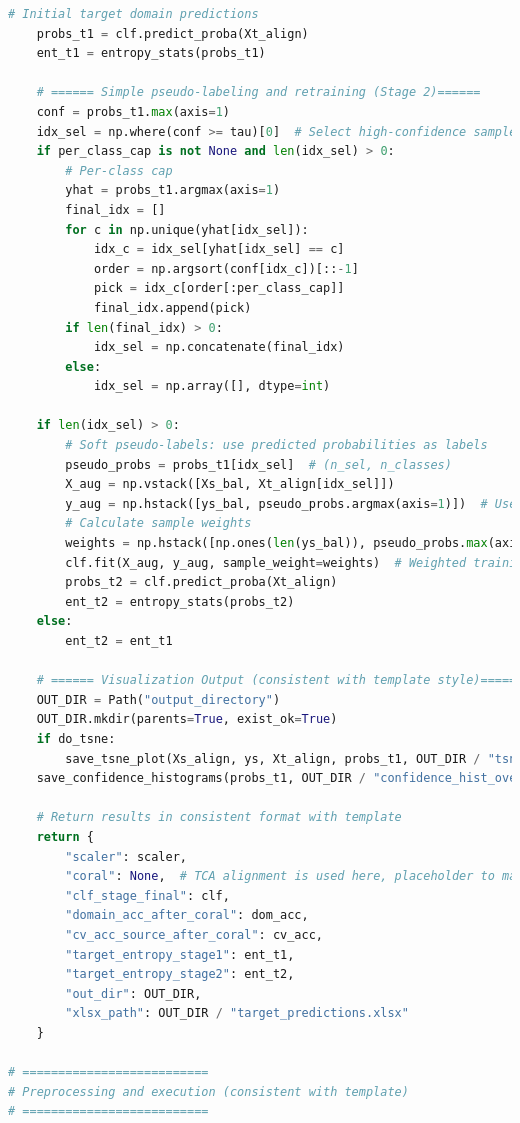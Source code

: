 \documentclass[a4paper]{CPIPC}
\numberwithin{equation}{section}
\begin{document}
\begin{lstlisting}[language=Python, caption=Random Forest Classifier]
    # Initial target domain predictions
    probs_t1 = clf.predict_proba(Xt_align)
    ent_t1 = entropy_stats(probs_t1)

    # ====== Simple pseudo-labeling and retraining (Stage 2)======
    conf = probs_t1.max(axis=1)
    idx_sel = np.where(conf >= tau)[0]  # Select high-confidence samples
    if per_class_cap is not None and len(idx_sel) > 0:
        # Per-class cap
        yhat = probs_t1.argmax(axis=1)
        final_idx = []
        for c in np.unique(yhat[idx_sel]):
            idx_c = idx_sel[yhat[idx_sel] == c]
            order = np.argsort(conf[idx_c])[::-1]
            pick = idx_c[order[:per_class_cap]]
            final_idx.append(pick)
        if len(final_idx) > 0:
            idx_sel = np.concatenate(final_idx)
        else:
            idx_sel = np.array([], dtype=int)

    if len(idx_sel) > 0:
        # Soft pseudo-labels: use predicted probabilities as labels
        pseudo_probs = probs_t1[idx_sel]  # (n_sel, n_classes)
        X_aug = np.vstack([Xs_bal, Xt_align[idx_sel]])
        y_aug = np.hstack([ys_bal, pseudo_probs.argmax(axis=1)])  # Use main labels
        # Calculate sample weights
        weights = np.hstack([np.ones(len(ys_bal)), pseudo_probs.max(axis=1)])
        clf.fit(X_aug, y_aug, sample_weight=weights)  # Weighted training
        probs_t2 = clf.predict_proba(Xt_align)
        ent_t2 = entropy_stats(probs_t2)
    else:
        ent_t2 = ent_t1

    # ====== Visualization Output (consistent with template style)======
    OUT_DIR = Path("output_directory")
    OUT_DIR.mkdir(parents=True, exist_ok=True)
    if do_tsne:
        save_tsne_plot(Xs_align, ys, Xt_align, probs_t1, OUT_DIR / "tsne_tca_source_target.png", random_state=random_state)
    save_confidence_histograms(probs_t1, OUT_DIR / "confidence_hist_overall_tca.png", OUT_DIR / "confidence_hist_per_class_tca")

    # Return results in consistent format with template
    return {
        "scaler": scaler,
        "coral": None,  # TCA alignment is used here, placeholder to maintain consistent interface
        "clf_stage_final": clf,
        "domain_acc_after_coral": dom_acc,
        "cv_acc_source_after_coral": cv_acc,
        "target_entropy_stage1": ent_t1,
        "target_entropy_stage2": ent_t2,
        "out_dir": OUT_DIR,
        "xlsx_path": OUT_DIR / "target_predictions.xlsx"
    }

# ==========================
# Preprocessing and execution (consistent with template)
# ==========================



\end{lstlisting}
\end{document}
